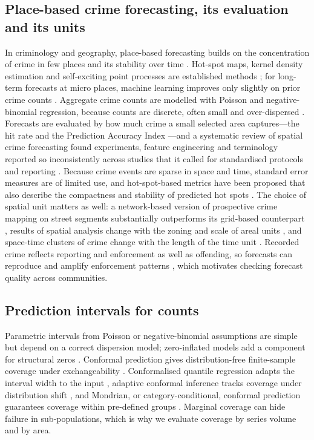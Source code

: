 \documentclass[preprint,12pt,authoryear]{elsarticle}
\begin{document}
\subsection{Place-based crime forecasting, its evaluation and its units}
In criminology and geography, place-based forecasting builds on the concentration of crime in few places and its stability over time \citep{weisburd2015law}. Hot-spot maps, kernel density estimation and self-exciting point processes are established methods \citep{chainey2008utility,mohler2015randomized}; for long-term forecasts at micro places, machine learning improves only slightly on prior crime counts \citep{wheeler2021mapping}. Aggregate crime counts are modelled with Poisson and negative-binomial regression, because counts are discrete, often small and over-dispersed \citep{osgood2000poisson}. Forecasts are evaluated by how much crime a small selected area captures---the hit rate and the Prediction Accuracy Index \citep{chainey2008utility}---and a systematic review of spatial crime forecasting found experiments, feature engineering and terminology reported so inconsistently across studies that it called for standardised protocols and reporting \citep{kounadi2020systematic}. Because crime events are sparse in space and time, standard error measures are of limited use, and hot-spot-based metrics have been proposed that also describe the compactness and stability of predicted hot spots \citep{adepeju2016novel}. The choice of spatial unit matters as well: a network-based version of prospective crime mapping on street segments substantially outperforms its grid-based counterpart \citep{rosser2017predictive}, results of spatial analysis change with the zoning and scale of areal units \citep{openshaw1984maup}, and space-time clusters of crime change with the length of the time unit \citep{cheng2014mtup}. Recorded crime reflects reporting and enforcement as well as offending, so forecasts can reproduce and amplify enforcement patterns \citep{lum2016predict,ensign2018runaway,richardson2019dirty}, which motivates checking forecast quality across communities.

\subsection{Prediction intervals for counts}
Parametric intervals from Poisson or negative-binomial assumptions are simple but depend on a correct dispersion model; zero-inflated models add a component for structural zeros \citep{lambert1992zero}. Conformal prediction gives distribution-free finite-sample coverage under exchangeability \citep{vovk2005algorithmic,lei2018distribution,angelopoulos2023gentle}. Conformalised quantile regression adapts the interval width to the input \citep{romano2019cqr}, adaptive conformal inference tracks coverage under distribution shift \citep{gibbs2021aci}, and Mondrian, or category-conditional, conformal prediction guarantees coverage within pre-defined groups \citep{vovk2005algorithmic}. Marginal coverage can hide failure in sub-populations, which is why we evaluate coverage by series volume and by area.
\end{document}
